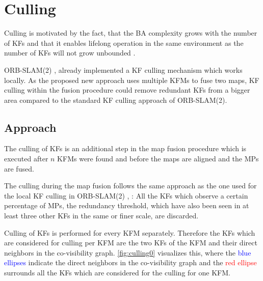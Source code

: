 \section{Culling}
\label{sec:culling}

Culling is motivated by the fact, that the \ac{BA} complexity grows with the number of \acp{KF} and that it enables lifelong operation in the same environment as the number of \acp{KF} will not grow unbounded \cite{Mur-Artal2015}.

ORB-SLAM(2) \cite{Mur-Artal2015}, \cite{Mur-Artal2016} already implemented a \ac{KF} culling mechanism which works locally. As the proposed new approach uses multiple \acp{KFM} to fuse two maps, \ac{KF} culling within the fusion procedure could remove redundant \acp{KF} from a bigger area compared to the standard \ac{KF} culling approach of ORB-SLAM(2).

\subsection{Approach}

The culling of \acp{KF} is an additional step in the map fusion procedure which is executed after $n$ \acp{KFM} were found and before the maps are aligned and the \acp{MP} are fused.

The culling during the map fusion follows the same approach as the one used for the local \ac{KF} culling in ORB-SLAM(2) \cite{Mur-Artal2015}, \cite{Mur-Artal2016}: All the \acp{KF} which observe a certain percentage of \acp{MP}, the redundancy threshold, which have also been seen in at least three other \acp{KF} in the same or finer scale, are discarded.

Culling of \acp{KF} is performed for every \ac{KFM} separately. Therefore the \acp{KF} which are considered for culling per \ac{KFM} are the two \acp{KF} of the \ac{KFM} and their direct neighbors in the co-visibility graph. \autoref{fig:culling0} visualizes this, where the \textcolor{blue}{blue ellipses} indicate the direct neighbors in the co-visibility graph and the \textcolor{red}{red ellipse} surrounds all the \acp{KF} which are considered for the culling for one \ac{KFM}.

